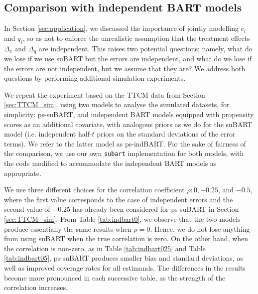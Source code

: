 \documentclass[aoas,preprint]{imsart}
\theoremstyle{plain}
\theoremstyle{definition}
\theoremstyle{remark}
\begin{document}
\begin{appendix}


\section{Comparison with independent BART models}
\setcounter{figure}{0}
\setcounter{table}{0}
\label{app:indBART}
 
In Section \ref{sec:application}, we discussed the importance of jointly modelling $c_i$ and $q_i$, so as not to enforce the unrealistic assumption that the treatment effects $\Delta_c$ and $\Delta_q$ are independent. This raises two potential questions; namely, what do we lose if we use suBART but the errors are independent, and what do we lose if the errors are not independent, but we assume that they are? We address both questions by performing additional simulation experiments. 

We repeat the experiment based on the TTCM data from Section \ref{sec:TTCM_sim}, using two models to analyse the simulated datasets, for simplicity: ps-suBART, and independent BART models equipped with propensity scores as an additional covariate, with analogous priors as we do for the suBART model (i.e. independent half-$t$ priors on the standard deviations of the error terms). We refer to the latter model as ps-indBART. For the sake of fairness of the comparison, we use our own \texttt{subart} implementation for both models, with the code modified to accommodate the independent BART models as appropriate. 

We use three different choices for the correlation coefficient $\rho\colon 0, -0.25$, and $-0.5$, where the first value corresponds to the case of independent errors and the second value of $-0.25$ has already been considered for ps-suBART in Section \ref{sec:TTCM_sim}. 
From Table \ref{tab:indbart0}, we observe that the two models produce essentially the same results when $\rho = 0$. Hence, we do not lose anything from using suBART when the true correlation is zero. On the other hand, when the correlation is non-zero, as in Table \ref{tab:indbart025} and Table \ref{tab:indbart05}, ps-suBART produces smaller bias and standard deviations, as well as improved coverage rates for all estimands. 
The differences in the results become more pronounced in each successive table, as the strength of the correlation increases.


\end{appendix}
\end{document}
